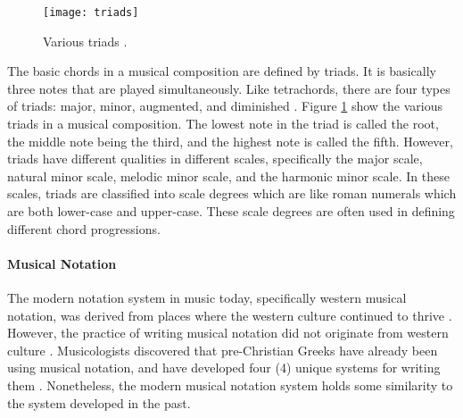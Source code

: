 \begin{figure}[H]
	\centering
	\texttt{[image: triads]}
    \caption{Various triads \citep{spencer1996music}.}
    \label{fig:MUSIC_triads}
\end{figure}
        
        The basic chords in a musical composition are defined by triads. It is basically three notes that are played simultaneously. Like tetrachords, there are four types of triads: major, minor, augmented, and diminished \citep{spencer1996music}. Figure \ref{fig:MUSIC_triads} show the various triads in a musical composition. The lowest note in the triad is called the root, the middle note being the third, and the highest note is called the fifth. However, triads have different qualities in different scales, specifically the major scale, natural minor scale, melodic minor scale, and the harmonic minor scale. In these scales, triads are classified into scale degrees which are like roman numerals which are both lower-case and upper-case. These scale degrees are often used in defining different chord progressions.
        
        
        \paragraph{Musical Notation}
        \label{sec:musical_notation}
        
        The modern notation system in music today, specifically western musical notation, was derived from places where the western culture continued to thrive \citep{read1969music}. However, the practice of writing musical notation did not originate from western culture \citep{read1969music}. Musicologists discovered that pre-Christian Greeks have already been using musical notation, and have developed four (4) unique systems for writing them \citep{read1969music}. Nonetheless, the modern musical notation system holds some similarity to the system developed in the past. 
        
        

